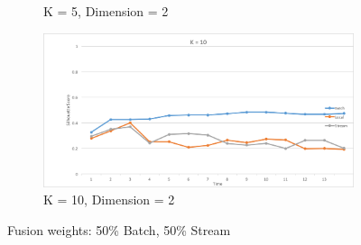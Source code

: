 \documentclass{lmproj}
\begin{document}
\begin{figure}[H]
\begin{subfigure}{.5\textwidth}
		\caption*{K = 5, Dimension = 2}
		\label{fig:silhouette_50_50_k_5_dim_2}
	\end{subfigure}%
	\begin{subfigure}{.5\textwidth}
		\centering
		\includegraphics[width=.8\linewidth]{silhouette/silhouette_50_50_k_10_dim_2}
		\caption*{K = 10, Dimension = 2}
		\label{fig:silhouette_50_50_k_10_dim_2}
	\end{subfigure}
	\caption{Fusion weights: 50\% Batch, 50\% Stream}
	\label{fig:fusion_50_50}
\end{figure}

\bigskip
\end{document}

